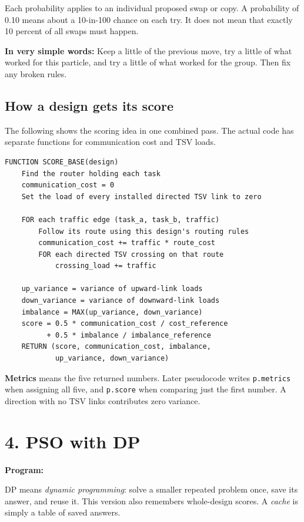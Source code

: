 \documentclass[11pt,a4paper]{article}
\newcommand{\code}[1]{\texttt{#1}}
\newcommand{\simple}[1]{\textbf{In very simple words:} #1}
\begin{document}
Each probability applies to an individual proposed swap or copy. A
probability of 0.10 means about a 10-in-100 chance on each try. It does not
mean that exactly 10 percent of all swaps must happen.

\simple{Keep a little of the previous move, try a little of what worked for
this particle, and try a little of what worked for the group. Then fix any
broken rules.}

\subsection*{How a design gets its score}
The following shows the scoring idea in one combined pass. The actual code
has separate functions for communication cost and TSV loads.

\begin{lstlisting}
FUNCTION SCORE_BASE(design)
    Find the router holding each task
    communication_cost = 0
    Set the load of every installed directed TSV link to zero

    FOR each traffic edge (task_a, task_b, traffic)
        Follow its route using this design's routing rules
        communication_cost += traffic * route_cost
        FOR each directed TSV crossing on that route
            crossing_load += traffic

    up_variance = variance of upward-link loads
    down_variance = variance of downward-link loads
    imbalance = MAX(up_variance, down_variance)
    score = 0.5 * communication_cost / cost_reference
          + 0.5 * imbalance / imbalance_reference
    RETURN (score, communication_cost, imbalance,
            up_variance, down_variance)
\end{lstlisting}

\textbf{Metrics} means the five returned numbers. Later pseudocode writes
\code{p.metrics} when assigning all five, and \code{p.score} when comparing
just the first number. A direction with no TSV links contributes zero
variance.

\clearpage
\section*{4. PSO with DP}
\textbf{Program:} 

DP means \emph{dynamic programming}: solve a smaller repeated problem once,
save its answer, and reuse it. This version also remembers whole-design
scores. A \emph{cache} is simply a table of saved answers.
\end{document}
